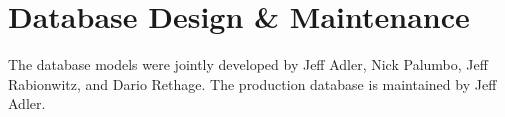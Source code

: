 \chapter{Database Design \& Maintenance}

The database models were jointly developed by Jeff Adler, Nick Palumbo, Jeff Rabionwitz, and Dario Rethage. The production database is maintained
by Jeff Adler.